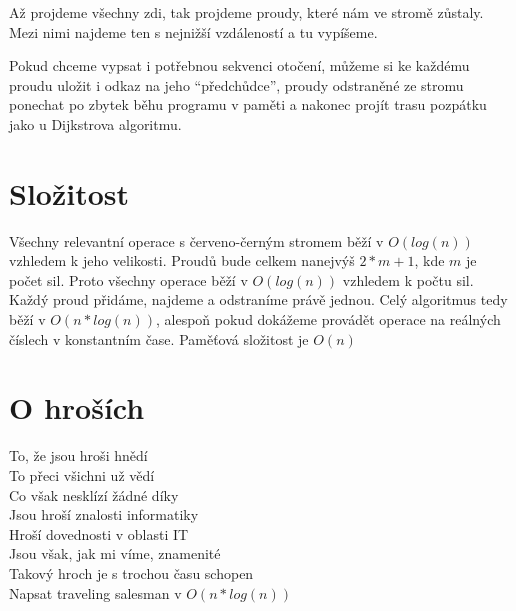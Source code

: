 \documentclass{article}
\begin{document}
Až projdeme všechny zdi, tak projdeme proudy, které nám ve stromě zůstaly. Mezi nimi najdeme ten s nejnižší vzdáleností a tu vypíšeme.

Pokud chceme vypsat i potřebnou sekvenci otočení, můžeme si ke každému proudu uložit i odkaz na jeho \enquote{předchůdce}, proudy odstraněné ze stromu ponechat po zbytek běhu programu v paměti a nakonec projít trasu pozpátku jako u Dijkstrova algoritmu.

\section{Složitost}

Všechny relevantní operace s červeno-černým stromem běží v \(O(log(n))\) vzhledem k jeho velikosti. Proudů bude celkem nanejvýš \(2 * m + 1\), kde \(m\) je počet sil. Proto všechny operace běží v \(O(log(n))\) vzhledem k počtu sil. Každý proud přidáme, najdeme a odstraníme právě jednou. Celý algoritmus tedy běží v \(O(n*log(n))\), alespoň pokud dokážeme provádět operace na reálných číslech v konstantním čase. Paměťová složitost je \(O(n)\)

\appendix
\newpage
\section{O hroších}

To, že jsou hroši hnědí \\
To přeci všichni už vědí \\
Co však nesklízí žádné díky \\
Jsou hroší znalosti informatiky \\
Hroší dovednosti v oblasti IT \\
Jsou však, jak mi víme, znamenité \\
Takový hroch je s trochou času schopen \\
Napsat traveling salesman v \(O(n*log(n))\)
\end{document}
